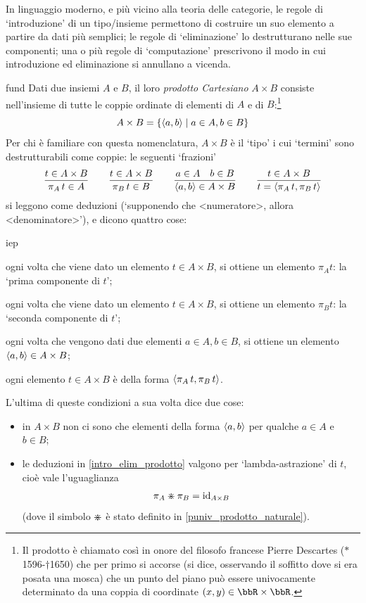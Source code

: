 In linguaggio moderno, e più vicino alla teoria delle categorie, le regole di `introduzione' di un tipo/insieme permettono di costruire un suo elemento a partire da dati più semplici; le regole di `eliminazione' lo destrutturano nelle sue componenti; una o più regole di `computazione' prescrivono il modo in cui introduzione ed eliminazione si annullano a vicenda.
\begin{hExample}{fund}\label{intro_elim_prodotto}
 Dati due insiemi \(A\) e \(B\), il loro \emph{prodotto Cartesiano} \(A\times B\) consiste nell'insieme di tutte le coppie ordinate di elementi di \(A\) e di \(B\):\footnote{Il prodotto è chiamato così in onore del filosofo francese Pierre Descartes (\(*\)1596-\(\dag\)1650) che per primo si accorse (si dice, osservando il soffitto dove si era posata una mosca) che un punto del piano può essere univocamente determinato da una coppia di coordinate \((x,y)\in\bbR\times\bbR\).}
 \[
  A\times B= \{\langle a,b\rangle \mid a\in A, b\in B\}
 \]
 Per chi è familiare con questa nomenclatura, \(A\times B\) è il `tipo' i cui `termini' sono destrutturabili come coppie: le seguenti `frazioni'
 \[\frac{t \in A\times B}{\pi_A\, t \in A}\qquad \frac{t \in A\times B}{\pi_B\, t \in B}\qquad \frac{a \in A\quad b \in B}{\langle a,b\rangle \in A\times B}\qquad \frac{t \in A\times B}{t = \langle \pi_A\, t,\pi_B\, t\rangle}\]
 si leggono come deduzioni (`supponendo che <numeratore>, allora <denominatore>'), e dicono quattro cose:
 \begin{enumtag}{iep}
  \item \label{iep_1} ogni volta che viene dato un elemento \(t \in A\times B\), si ottiene un elemento \(\pi_A t\): la `prima componente di \(t\)';
  \item \label{iep_2} ogni volta che viene dato un elemento \(t \in A\times B\), si ottiene un elemento \(\pi_B t\): la `seconda componente di \(t\)';
  \item \label{iep_3} ogni volta che vengono dati due elementi \(a \in A, b \in B\), si ottiene un elemento \(\langle a,b\rangle \in A\times B\);
  \item \label{iep_4} ogni elemento \(t \in A\times B\) è della forma \(\langle \pi_A\, t,\pi_B\, t\rangle\).
 \end{enumtag}
 L'ultima di queste condizioni a sua volta dice due cose:
 \begin{itemize}
  \item in \(A\times B\) non ci sono che elementi della forma \(\langle a,b\rangle\) per qualche \(a \in A\) e \(b \in B\);
  \item le deduzioni in \ref{intro_elim_prodotto} valgono per `lambda-astrazione' di \(t\), cioè vale l'uguaglianza
        \[{\pi_A}\divideontimes{\pi_B} = \mathrm{id}_{A\times B} \]
        (dove il simbolo $\divideontimes$ è stato definito in \ref{puniv_prodotto_naturale}).
 \end{itemize}
\end{hExample}
